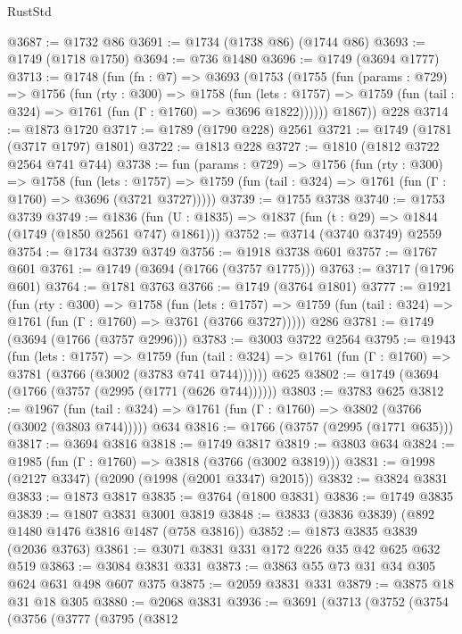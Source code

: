 \begin{lexlean}{RustStd}
\begin{coremodule}
@3687 := @1732 @86
@3691 := @1734 (@1738 @86) (@1744 @86)
@3693 := @1749 (@1718 @1750)
@3694 := @736 @1480
@3696 := @1749 (@3694 @1777)
@3713 := @1748
    (fun (fn : @7) =>
    @3693
      (@1753
        (@1755
          (fun (params : @729) =>
          @1756
            (fun (rty : @300) =>
            @1758
              (fun (lets : @1757) =>
              @1759 (fun (tail : @324) => @1761 (fun (Γ : @1760) => @3696 @1822))))))
        @1867))
    @228
@3714 := @1873 @1720
@3717 := @1789 (@1790 @228) @2561
@3721 := @1749 (@1781 (@3717 @1797) @1801)
@3722 := @1813 @228
@3727 := @1810 (@1812 @3722 @2564 @741 @744)
@3738 := fun (params : @729) =>
  @1756
    (fun (rty : @300) =>
    @1758
      (fun (lets : @1757) =>
      @1759 (fun (tail : @324) => @1761 (fun (Γ : @1760) => @3696 (@3721 @3727)))))
@3739 := @1755 @3738
@3740 := @1753 @3739
@3749 := @1836 (fun (U : @1835) => @1837 (fun (t : @29) => @1844 (@1749 (@1850 @2561 @747) @1861)))
@3752 := @3714 (@3740 @3749) @2559
@3754 := @1734 @3739 @3749
@3756 := @1918 @3738 @601
@3757 := @1767 @601
@3761 := @1749 (@3694 (@1766 (@3757 @1775)))
@3763 := @3717 (@1796 @601)
@3764 := @1781 @3763
@3766 := @1749 (@3764 @1801)
@3777 := @1921
    (fun (rty : @300) =>
    @1758
      (fun (lets : @1757) =>
      @1759 (fun (tail : @324) => @1761 (fun (Γ : @1760) => @3761 (@3766 @3727)))))
    @286
@3781 := @1749 (@3694 (@1766 (@3757 @2996)))
@3783 := @3003 @3722 @2564
@3795 := @1943
    (fun (lets : @1757) =>
    @1759 (fun (tail : @324) => @1761 (fun (Γ : @1760) => @3781 (@3766 (@3002 (@3783 @741 @744))))))
    @625
@3802 := @1749 (@3694 (@1766 (@3757 (@2995 (@1771 (@626 @744))))))
@3803 := @3783 @625
@3812 := @1967
    (fun (tail : @324) => @1761 (fun (Γ : @1760) => @3802 (@3766 (@3002 (@3803 @744)))))
    @634
@3816 := @1766 (@3757 (@2995 (@1771 @635)))
@3817 := @3694 @3816
@3818 := @1749 @3817
@3819 := @3803 @634
@3824 := @1985 (fun (Γ : @1760) => @3818 (@3766 (@3002 @3819)))
@3831 := @1998 (@2127 @3347) (@2090 (@1998 (@2001 @3347) @2015))
@3832 := @3824 @3831
@3833 := @1873 @3817
@3835 := @3764 (@1800 @3831)
@3836 := @1749 @3835
@3839 := @1807 @3831 @3001 @3819
@3848 := @3833 (@3836 @3839) (@892 @1480 @1476 @3816 @1487 (@758 @3816))
@3852 := @1873 @3835 @3839 (@2036 @3763)
@3861 := @3071 @3831 @331 @172 @226 @35 @42 @625 @632 @519
@3863 := @3084 @3831 @331
@3873 := @3863 @55 @73 @31 @34 @305 @624 @631 @498 @607 @375
@3875 := @2059 @3831 @331
@3879 := @3875 @18 @31 @18 @305
@3880 := @2068 @3831
@3936 := @3691
    (@3713
      (@3752
        (@3754
          (@3756
            (@3777
              (@3795
                (@3812

\end{coremodule}
\end{lexlean}
